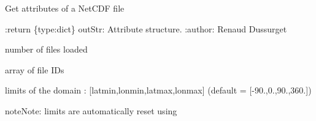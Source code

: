 \documentclass[letterpaper,10pt,english]{sphinxmanual}
\begin{document}
\begin{fulllineitems}
\begin{quote}
\begin{description}
\begin{itemize}
\end{itemize}

\end{description}\end{quote}

\begin{fulllineitems}
\label{altimetry.tools.nctools:altimetry.tools.nctools.nc.attributes}
Get attributes of a NetCDF file

:return \{type:dict\} outStr: Attribute structure.
:author: Renaud Dussurget

\end{fulllineitems}


\begin{fulllineitems}
\label{altimetry.tools.nctools:altimetry.tools.nctools.nc.count}
number of files loaded

\end{fulllineitems}


\begin{fulllineitems}
\label{altimetry.tools.nctools:altimetry.tools.nctools.nc.fileid}
array of file IDs

\end{fulllineitems}


\begin{fulllineitems}
\label{altimetry.tools.nctools:altimetry.tools.nctools.nc.limit}
limits of the domain : {[}latmin,lonmin,latmax,lonmax{]} (default = {[}-90.,0.,90.,360.{]})

\begin{notice}{note}{Note:}
limits are automatically reset using 
\end{notice}

\end{fulllineitems}



\end{fulllineitems}
\end{document}
